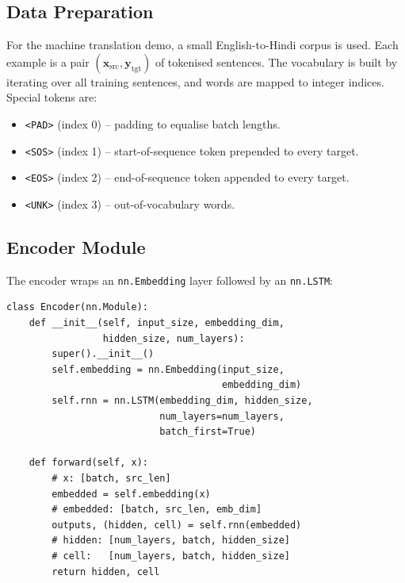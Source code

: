 \documentclass[12pt,a4paper]{article}
\begin{document}
\subsection{Data Preparation}

For the machine translation demo, a small English-to-Hindi corpus is used. Each example is a
pair $(\mathbf{x}_{\text{src}}, \mathbf{y}_{\text{tgt}})$ of tokenised sentences. The
vocabulary is built by iterating over all training sentences, and words are mapped to integer
indices. Special tokens are:
\begin{itemize}[noitemsep]
  \item \texttt{<PAD>} (index 0) -- padding to equalise batch lengths.
  \item \texttt{<SOS>} (index 1) -- start-of-sequence token prepended to every target.
  \item \texttt{<EOS>} (index 2) -- end-of-sequence token appended to every target.
  \item \texttt{<UNK>} (index 3) -- out-of-vocabulary words.
\end{itemize}

\subsection{Encoder Module}

The encoder wraps an \texttt{nn.Embedding} layer followed by an \texttt{nn.LSTM}:

\begin{tcolorbox}[colback=gray!5!white,colframe=gray!60!black,title=\texttt{Encoder} (PyTorch)]
\begin{verbatim}
class Encoder(nn.Module):
    def __init__(self, input_size, embedding_dim,
                 hidden_size, num_layers):
        super().__init__()
        self.embedding = nn.Embedding(input_size,
                                      embedding_dim)
        self.rnn = nn.LSTM(embedding_dim, hidden_size,
                           num_layers=num_layers,
                           batch_first=True)

    def forward(self, x):
        # x: [batch, src_len]
        embedded = self.embedding(x)
        # embedded: [batch, src_len, emb_dim]
        outputs, (hidden, cell) = self.rnn(embedded)
        # hidden: [num_layers, batch, hidden_size]
        # cell:   [num_layers, batch, hidden_size]
        return hidden, cell
\end{verbatim}
\end{tcolorbox}
\end{document}
